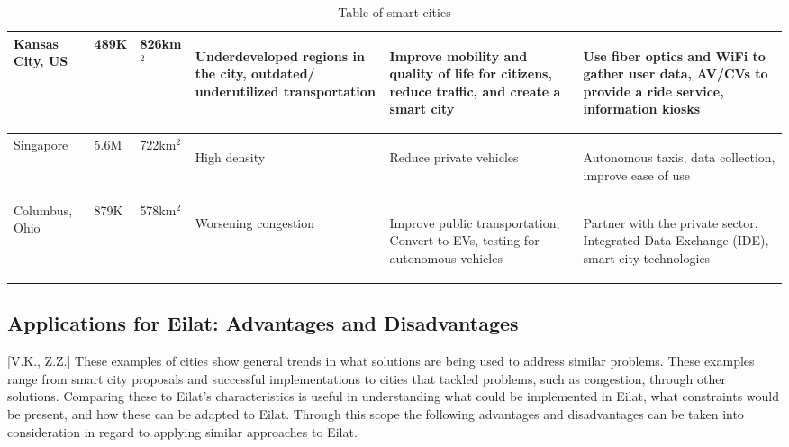 \documentclass[12pt]{article}                       %
\begin{document}
\begin{table}[H]
\begin{tabular}{ m{1.7cm} | m{1.1cm} | m{1.3cm} | m{3.4cm} | m{3.4cm} | m{3.4cm} }
        Kansas City, US &
        489K &
        826km$^2$ &
        \begin{flushleft}Underdeveloped regions in the city, outdated/ underutilized transportation\end{flushleft} &
        \begin{flushleft}Improve mobility and quality of life for citizens, reduce traffic, and create a smart city\end{flushleft} &
        \begin{flushleft}Use fiber optics and WiFi to gather user data, AV/CVs to provide a ride service, information kiosks \end{flushleft} \\
        \hline{}
        
        Singapore &
        5.6M &
        722km$^2$ &
        \begin{flushleft}High density \end{flushleft} &
        \begin{flushleft}Reduce private vehicles \end{flushleft} &
        \begin{flushleft}Autonomous taxis, data collection, improve ease of use\end{flushleft} \\
        \hline{}
        
        Columbus, Ohio &
        879K &
        578km$^2$ &
        \begin{flushleft}Worsening congestion\end{flushleft} &
        \begin{flushleft}Improve public transportation, Convert to EVs, testing for autonomous vehicles\end{flushleft} &
        \begin{flushleft}Partner with the private sector, Integrated Data Exchange (IDE), smart city technologies\end{flushleft}
    \end{tabular}
    \caption{Table of smart cities}
    \label{tab:smart_cities}
\end{table}

\subsection{Applications for Eilat: Advantages and Disadvantages}[V.K., Z.Z.]
These examples of cities show general trends in what solutions are being used to address similar problems. These examples range from smart city proposals and successful implementations to cities that tackled problems, such as congestion, through other solutions. Comparing these to Eilat's characteristics is useful in understanding what could be implemented in Eilat, what constraints would be present, and how these can be adapted to Eilat. Through this scope the following advantages and disadvantages can be taken into consideration in regard to applying similar approaches to Eilat. 
\end{document}

